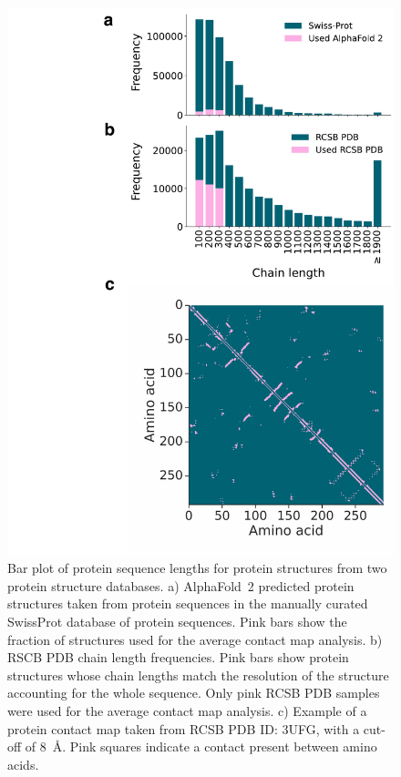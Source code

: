 \documentclass[10pt]{iopart}
\begin{document}
 \begin{figure}[htb]
        \centering
	\includegraphics[width=0.5\columnwidth]{paper/figures/Fig2/Fig2.pdf}
	    \caption{Bar plot of protein sequence lengths for protein structures from two protein structure databases. a) AlphaFold~2 predicted protein structures taken from protein sequences in the manually curated SwissProt database of protein sequences. Pink bars show the fraction of structures used for the average contact map analysis. b) RSCB PDB chain length frequencies. Pink bars show protein structures whose chain lengths match the resolution of the structure accounting for the whole sequence. Only pink RCSB PDB samples were used for the average contact map analysis. c) Example of a protein contact map taken from RCSB PDB ID: 3UFG, with a cut-off of 8~Å. Pink squares indicate a contact present between amino acids.}
        \label{fig:pdb_stats}
\end{figure}
\end{document}
